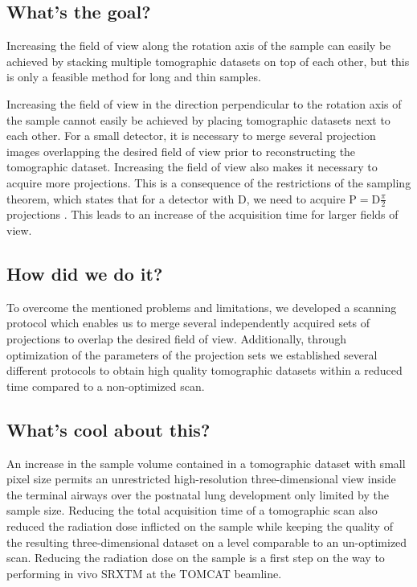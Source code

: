 \subsection{What's the goal?}
Increasing the field of view along the rotation axis of the sample can easily be achieved by stacking multiple tomographic datasets on top of each other, but this is only a feasible method for long and thin samples. 

Increasing the field of view in the direction perpendicular to the rotation axis of the sample cannot easily be achieved by placing tomographic datasets next to each other. For a small detector, it is necessary to merge several projection images overlapping the desired field of view prior to reconstructing the tomographic dataset. Increasing the field of view also makes it necessary to acquire more projections. This is a consequence of the restrictions of the sampling theorem, which states that for a detector with D, we need to acquire $\textrm{P}=\textrm{D}\frac{\pi}{2}$ projections \cite[page 186]{Kak2002}. This leads to an increase of the acquisition time for larger fields of view.

\subsection{How did we do it?}
To overcome the mentioned problems and limitations, we developed a scanning protocol which enables us to merge several independently acquired sets of projections to overlap the desired field of view. Additionally, through optimization of the parameters of the projection sets we established several different protocols to obtain high quality tomographic datasets within a reduced time compared to a non-optimized scan.

\subsection{What's cool about this?}
An increase in the sample volume contained in a tomographic dataset with small pixel size permits an unrestricted high-resolution three-dimensional view inside the terminal airways over the postnatal lung development only limited by the sample size. Reducing the total acquisition time of a tomographic scan also reduced the radiation dose inflicted on the sample while keeping the quality of the resulting three-dimensional dataset on a level comparable to an un-optimized scan. Reducing the radiation dose on the sample is a first step on the way to performing in vivo SRXTM at the TOMCAT beamline.